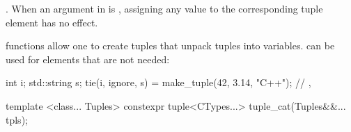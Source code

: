 \begin{itemdescr}
\pnum
\returns {}.  When an
argument in  is , assigning
any value to the corresponding tuple element has no effect.

\pnum
\begin{example}
 functions allow one to create tuples that unpack
tuples into variables.  can be used for elements that
are not needed:
\begin{codeblock}
int i; std::string s;
tie(i, ignore, s) = make_tuple(42, 3.14, "C++");
// , 
\end{codeblock}
\end{example}
\end{itemdescr}

\begin{itemdecl}
template <class... Tuples>
  constexpr tuple<CTypes...> tuple_cat(Tuples&&... tpls);
\end{itemdecl}

